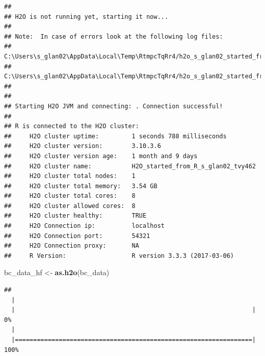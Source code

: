 \documentclass[]{article}
\newenvironment{Shaded}{\begin{snugshade}}{\end{snugshade}}
\newcommand{\KeywordTok}[1]{\textcolor[rgb]{0.13,0.29,0.53}{\textbf{{#1}}}}
\newcommand{\StringTok}[1]{\textcolor[rgb]{0.31,0.60,0.02}{{#1}}}
\newcommand{\NormalTok}[1]{{#1}}
\begin{document}
\begin{verbatim}
## 
## H2O is not running yet, starting it now...
## 
## Note:  In case of errors look at the following log files:
##     C:\Users\s_glan02\AppData\Local\Temp\RtmpcTqRr4/h2o_s_glan02_started_from_r.out
##     C:\Users\s_glan02\AppData\Local\Temp\RtmpcTqRr4/h2o_s_glan02_started_from_r.err
## 
## 
## Starting H2O JVM and connecting: . Connection successful!
## 
## R is connected to the H2O cluster: 
##     H2O cluster uptime:         1 seconds 788 milliseconds 
##     H2O cluster version:        3.10.3.6 
##     H2O cluster version age:    1 month and 9 days  
##     H2O cluster name:           H2O_started_from_R_s_glan02_tvy462 
##     H2O cluster total nodes:    1 
##     H2O cluster total memory:   3.54 GB 
##     H2O cluster total cores:    8 
##     H2O cluster allowed cores:  8 
##     H2O cluster healthy:        TRUE 
##     H2O Connection ip:          localhost 
##     H2O Connection port:        54321 
##     H2O Connection proxy:       NA 
##     R Version:                  R version 3.3.3 (2017-03-06)
\end{verbatim}

\begin{Shaded}
\begin{Highlighting}[]
\NormalTok{bc_data_hf <-}\StringTok{ }\KeywordTok{as.h2o}\NormalTok{(bc_data)}
\end{Highlighting}
\end{Shaded}

\begin{verbatim}
## 
  |                                                                       
  |                                                                 |   0%
  |                                                                       
  |=================================================================| 100%
\end{verbatim}
\end{document}
